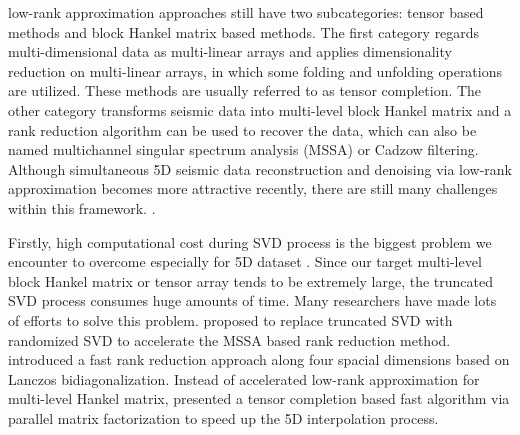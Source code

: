 low-rank approximation approaches still have two subcategories: tensor based methods and block Hankel matrix based methods. The first category regards multi-dimensional data as multi-linear arrays and applies dimensionality reduction on multi-linear arrays, in which some folding and unfolding operations are utilized. These methods are usually referred to as tensor completion. The other category transforms seismic data into multi-level block Hankel matrix and a rank reduction algorithm can be used to recover the data, which can also be named multichannel singular spectrum analysis (MSSA) or Cadzow filtering. Although simultaneous 5D seismic data reconstruction and denoising via low-rank approximation becomes more attractive recently, there are still many challenges within this framework. .  

Firstly, high computational cost during SVD process is the biggest problem we encounter to overcome especially for 5D dataset \cite{lu2015fast,jinkun2016}. Since our target multi-level block Hankel matrix or tensor array tends to be extremely large, the truncated SVD process consumes huge amounts of time. Many researchers have made lots of efforts to solve this problem. \cite{oropezamssa} proposed to replace truncated SVD with randomized SVD to accelerate the MSSA based rank reduction method. \cite{gaomssa} introduced a fast rank reduction approach along four spacial dimensions based on Lanczos bidiagonalization. Instead of accelerated low-rank approximation for multi-level Hankel matrix, \cite{pmf} presented a tensor completion based fast algorithm via parallel matrix factorization to speed up the 5D interpolation process. 

